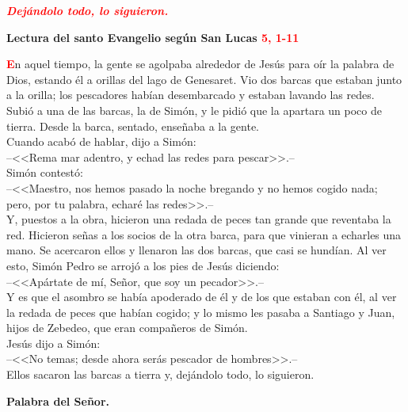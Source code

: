 \documentclass[12pt, letterpaper]{report}
\begin{document}
\begin{center}
\large {\bfseries \textit{ \textcolor{red}{Dej\'andolo todo, lo siguieron.}}}
\end{center}

\Huge \textcolor{red}{} \Large {\bfseries Lectura del santo Evangelio seg\'un San Lucas \hspace{1cm} \textcolor{red}{5, 1-11}}

\lettrine[lines=2]{\bfseries \textcolor{red}{E}}{}\Large n aquel tiempo, la gente se agolpaba alrededor de Jes\'us para o\'ir la palabra de Dios, estando \'el a orillas del lago de Genesaret. Vio dos barcas que estaban junto a la orilla; los pescadores hab\'ian desembarcado y estaban lavando las redes.\\
Subi\'o a una de las barcas, la de Sim\'on, y le pidi\'o que la apartara un poco de tierra. Desde la barca, sentado, ense\~naba a la gente.\\
Cuando acab\'o de hablar, dijo a Sim\'on:\\
--<<Rema mar adentro, y echad las redes para pescar>>.--\\
Sim\'on contest\'o:\\
--<<Maestro, nos hemos pasado la noche bregando y no hemos cogido nada; pero, por tu palabra, echar\'e las redes>>.--\\
Y, puestos a la obra, hicieron una redada de peces tan grande que reventaba la red. Hicieron se\~nas a los socios de la otra barca, para que vinieran a echarles una mano. Se acercaron ellos y llenaron las dos barcas, que casi se hund\'ian. Al ver esto, Sim\'on Pedro se arroj\'o a los pies de Jes\'us diciendo:\\
--<<Ap\'artate de m\'i, Se\~nor, que soy un pecador>>.--\\
Y es que el asombro se hab\'ia apoderado de \'el y de los que estaban con \'el, al ver la redada de peces que hab\'ian cogido; y lo mismo les pasaba a Santiago y Juan, hijos de Zebedeo, que eran compa\~neros de Sim\'on.\\
Jes\'us dijo a Sim\'on:\\
--<<No temas; desde ahora ser\'as pescador de hombres>>.--\\
Ellos sacaron las barcas a tierra y, dej\'andolo todo, lo siguieron.

{\bfseries Palabra del Se\~nor.}
\end{document}
